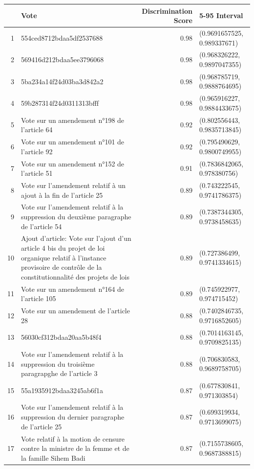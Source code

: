 \begin{table}[ht]
\centering
\begin{tabular}{rlrl}
  \hline
 & Vote & Discrimination Score & 5-95 Interval \\ 
  \hline
1 & 554ced8712bdaa5df2537688 & 0.98 & (0.9691657525, 0.989337671) \\ 
  2 & 569416d212bdaa5ee3796068 & 0.98 & (0.968326222, 0.9897047355) \\ 
  3 & 5ba234a14f24d03ba3d842a2 & 0.98 & (0.968785719, 0.9888764695) \\ 
  4 & 59b287314f24d0311313bfff & 0.98 & (0.965916227, 0.9884433675) \\ 
  5 & Vote sur un amendement n°198 de l'article 64 & 0.92 & (0.802556443, 0.9835713845) \\ 
  6 & Vote sur un amendement n°101 de l'article 92 & 0.92 & (0.795490629, 0.9800749955) \\ 
  7 & Vote sur un amendement n°152 de l'article 51 & 0.91 & (0.7836842065, 0.978380756) \\ 
  8 & Vote sur l'amendement relatif à un ajout à la fin de l'article 25 & 0.89 & (0.743222545, 0.9741786375) \\ 
  9 & Vote sur l'amendement relatif à la suppression du deuxième paragraphe de l'article 54 & 0.89 & (0.7387344305, 0.9738458635) \\ 
  10 & Ajout d'article: Vote sur l'ajout d'un article 4 bis du projet de loi organique relatif à l'instance provisoire de contrôle de la constitutionnalité des projets de lois & 0.89 & (0.727386499, 0.9741334615) \\ 
  11 & Vote sur un amendement n°164 de l'article 105 & 0.89 & (0.745922977, 0.974715452) \\ 
  12 & Vote sur un amendement de l'article 28 & 0.88 & (0.7402846735, 0.9716852605) \\ 
  13 & 56030cf312bdaa20aa5b48f4 & 0.88 & (0.7014163145, 0.9709825135) \\ 
  14 & Vote sur l'amendement relatif à la suppression du troisième paragrapghe de l'article 3 & 0.88 & (0.706830583, 0.9689758705) \\ 
  15 & 55a1935912bdaa3245ab6f1a & 0.87 & (0.677830841, 0.971303854) \\ 
  16 & Vote sur l'amendement relatif à la suppression du dernier paragraphe de l'article 25 & 0.87 & (0.699319934, 0.9713699075) \\ 
  17 & Vote relatif à la motion de censure contre la ministre de la femme et de la famille Sihem Badi & 0.87 & (0.7155738605, 0.9687388815) \\ 

\end{tabular}
\end{table}
